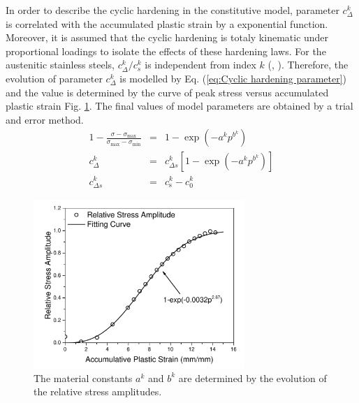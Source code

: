 \documentclass[preprint,5p,twocolumn,10pt,sort&compress]{elsarticle}
\begin{document}
In order to describe the cyclic hardening in the constitutive model, parameter $c_{\Delta}^{k}$ is correlated with the accumulated plastic strain by a exponential function. Moreover, it is assumed that the cyclic hardening is totaly kinematic under proportional loadings to isolate the effects of these hardening laws. For the austenitic stainless steels, $c_{\Delta}^{k}/c_{s}^{k}$ is independent from index $k$ (\citeauthor{Fang2015Cyclic}, \citeyear{Fang2015Cyclic}). Therefore, the evolution of parameter $c_{\Delta}^{k}$ is modelled by Eq. (\ref{eq:Cyclic hardening parameter}) and the value is determined by the curve of peak stress versus accumulated plastic strain Fig. \ref{fig:Stress Amplitude Evolution}. The final values of model parameters are obtained by a trial and error method.
\begin{eqnarray}\label{eq:Cyclic hardening parameter}
1-\frac{\sigma-\sigma_{\max}}{\sigma_{\max}-\sigma_{\min }}&=&1- \exp\left ( -a^{k} p^{b^{k}} \right )\\
c_{\Delta}^{k}&=&c_{\Delta s}^{k}\left[1- \exp\left ( -a^{k} p^{b^{k}} \right ) \right]\\
c_{\Delta s}^{k}&=&c_{\mathrm{s}}^{k}-c_{0}^{k}
\end{eqnarray}
\begin{figure}[ht]
\centering
\includegraphics[width=8cm]{RelativeStressAmplitudeEvolution.pdf}
\caption{The material constants $a^{k}$ and $b^{k}$ are determined by the evolution of the relative stress amplitudes.}
\label{fig:Stress Amplitude Evolution}
\end{figure}
\end{document}
